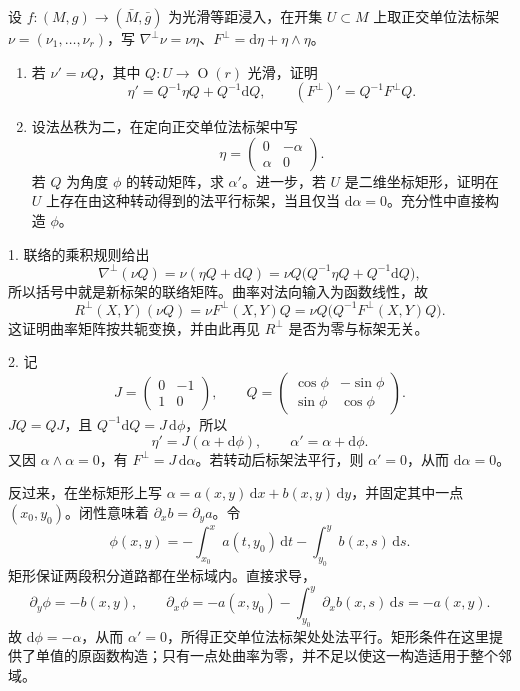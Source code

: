 \begin{exercise}\label{g3:ex:normal-frame-change}
	设 \(f:(M,g)\to(\bar M,\bar g)\) 为光滑等距浸入，在开集 \(U\subset M\) 上取正交单位法标架 \(\nu=(\nu_1,\ldots,\nu_r)\)，写
	\(\nabla^\perp\nu=\nu\eta\)、\(F^\perp=\mathrm d\eta+\eta\wedge\eta\)。
	\begin{enumerate}
		\item 若 \(\nu'=\nu Q\)，其中 \(Q:U\to\operatorname{O}(r)\) 光滑，证明
		\[
			\eta'=Q^{-1}\eta Q+Q^{-1}\mathrm dQ,\qquad
			(F^\perp)'=Q^{-1}F^\perp Q.
		\]
		\item 设法丛秩为二，在定向正交单位法标架中写
		\[
			\eta=\begin{pmatrix}0&-\alpha\\\alpha&0\end{pmatrix}.
		\]
		若 \(Q\) 为角度 \(\phi\) 的转动矩阵，求 \(\alpha'\)。进一步，若 \(U\) 是二维坐标矩形，证明在 \(U\) 上存在由这种转动得到的法平行标架，当且仅当 \(\mathrm d\alpha=0\)。充分性中直接构造 \(\phi\)。
	\end{enumerate}
\end{exercise}
\begin{solution}
	1. 联络的乘积规则给出
	\[
		\nabla^\perp(\nu Q)=\nu(\eta Q+\mathrm dQ)
		=\nu Q\bigl(Q^{-1}\eta Q+Q^{-1}\mathrm dQ\bigr),
	\]
	所以括号中就是新标架的联络矩阵。曲率对法向输入为函数线性，故
	\[
		R^\perp(X,Y)(\nu Q)=\nu F^\perp(X,Y)Q
		=\nu Q\bigl(Q^{-1}F^\perp(X,Y)Q\bigr).
	\]
	这证明曲率矩阵按共轭变换，并由此再见 \(R^\perp\) 是否为零与标架无关。

	2. 记
	\[
		J=\begin{pmatrix}0&-1\\1&0\end{pmatrix},\qquad
		Q=\begin{pmatrix}\cos\phi&-\sin\phi\\
			\sin\phi&\cos\phi\end{pmatrix}.
	\]
	\(JQ=QJ\)，且 \(Q^{-1}\mathrm dQ=J\,\mathrm d\phi\)，所以
	\[
		\eta'=J(\alpha+\mathrm d\phi),\qquad
		\alpha'=\alpha+\mathrm d\phi.
	\]
	又因 \(\alpha\wedge\alpha=0\)，有 \(F^\perp=J\,\mathrm d\alpha\)。若转动后标架法平行，则 \(\alpha'=0\)，从而 \(\mathrm d\alpha=0\)。

	反过来，在坐标矩形上写 \(\alpha=a(x,y)\,\mathrm dx+b(x,y)\,\mathrm dy\)，并固定其中一点 \((x_0,y_0)\)。闭性意味着 \(\partial_xb=\partial_ya\)。令
	\[
		\phi(x,y)
		=-\int_{x_0}^x a(t,y_0)\,\mathrm dt
			-\int_{y_0}^y b(x,s)\,\mathrm ds.
	\]
	矩形保证两段积分道路都在坐标域内。直接求导，
	\[
		\partial_y\phi=-b(x,y),\qquad
		\partial_x\phi=-a(x,y_0)
			-\int_{y_0}^y\partial_xb(x,s)\,\mathrm ds=-a(x,y).
	\]
	故 \(\mathrm d\phi=-\alpha\)，从而 \(\alpha'=0\)，所得正交单位法标架处处法平行。矩形条件在这里提供了单值的原函数构造；只有一点处曲率为零，并不足以使这一构造适用于整个邻域。
\end{solution}

